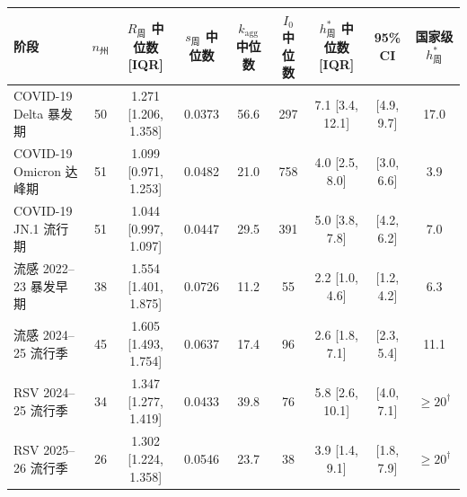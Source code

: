 \begin{tabular}{lcccccccc}
\toprule
阶段 & $n_{\text{州}}$ & $R_{\text{周}}$ 中位数 [IQR] & $s_{\text{周}}$ 中位数 & $k_{\text{agg}}$ 中位数 & $I_0$ 中位数 & $h^*_{\text{周}}$ 中位数 [IQR] & 95\% CI & 国家级 $h^*_{\text{周}}$ \\
\midrule
COVID-19 Delta 暴发期 & 50 & 1.271 [1.206, 1.358] & 0.0373 & 56.6 & 297 & 7.1 [3.4, 12.1] & [4.9, 9.7] & 17.0 \\
COVID-19 Omicron 达峰期 & 51 & 1.099 [0.971, 1.253] & 0.0482 & 21.0 & 758 & 4.0 [2.5, 8.0] & [3.0, 6.6] & 3.9 \\
COVID-19 JN.1 流行期 & 51 & 1.044 [0.997, 1.097] & 0.0447 & 29.5 & 391 & 5.0 [3.8, 7.8] & [4.2, 6.2] & 7.0 \\
流感 2022--23 暴发早期 & 38 & 1.554 [1.401, 1.875] & 0.0726 & 11.2 & 55 & 2.2 [1.0, 4.6] & [1.2, 4.2] & 6.3 \\
流感 2024--25 流行季 & 45 & 1.605 [1.493, 1.754] & 0.0637 & 17.4 & 96 & 2.6 [1.8, 7.1] & [2.3, 5.4] & 11.1 \\
RSV 2024--25 流行季 & 34 & 1.347 [1.277, 1.419] & 0.0433 & 39.8 & 76 & 5.8 [2.6, 10.1] & [4.0, 7.1] & $\ge 20^{\dagger}$ \\
RSV 2025--26 流行季 & 26 & 1.302 [1.224, 1.358] & 0.0546 & 23.7 & 38 & 3.9 [1.4, 9.1] & [1.8, 7.9] & $\ge 20^{\dagger}$ \\
\bottomrule
\end{tabular}